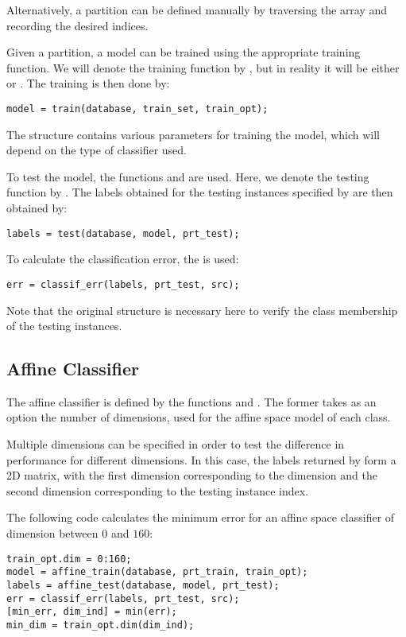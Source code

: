 \documentclass[twocolumn]{article}
\begin{document}
Alternatively, a partition can be defined manually by traversing the  array and recording the desired indices.

Given a partition, a model can be trained using the appropriate training function. We will denote the training function by , but in reality it will be either  or . The training is then done by:
\begin{lstlisting}
model = train(database, train_set, train_opt);
\end{lstlisting}
The structure  contains various parameters for training the model, which will depend on the type of classifier used.

To test the model, the functions  and  are used. Here, we denote the testing function by . The labels obtained for the testing instances specified by  are then obtained by:
\begin{lstlisting}
labels = test(database, model, prt_test);
\end{lstlisting}
To calculate the classification error, the  is used:
\begin{lstlisting}
err = classif_err(labels, prt_test, src);
\end{lstlisting}
Note that the original  structure is necessary here to verify the class membership of the testing instances.

\subsection{Affine Classifier}

The affine classifier is defined by the functions  and . The former takes as an option the number of dimensions,  used for the affine space model of each class. 

Multiple dimensions can be specified in order to test the difference in performance for different dimensions. In this case, the labels returned by  form a 2D matrix, with the first dimension corresponding to the dimension and the second dimension corresponding to the testing instance index.

The following code calculates the minimum error for an affine space classifier of dimension between $0$ and $160$:
\begin{lstlisting}
train_opt.dim = 0:160;
model = affine_train(database, prt_train, train_opt);
labels = affine_test(database, model, prt_test);
err = classif_err(labels, prt_test, src);
[min_err, dim_ind] = min(err);
min_dim = train_opt.dim(dim_ind);
\end{lstlisting}
\end{document}
